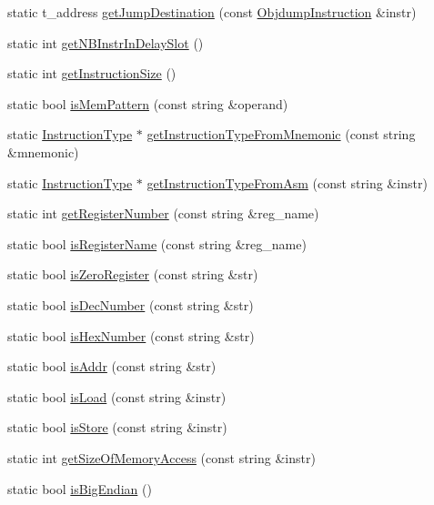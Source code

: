 \begin{DoxyCompactItemize}
\item 
static t\+\_\+address \hyperlink{classArch_a14e634f478d8e7f6b76680184ffdddaf}{get\+Jump\+Destination} (const \hyperlink{classObjdumpInstruction}{Objdump\+Instruction} \&instr)
\item 
static int \hyperlink{classArch_a2cfdbdf8fe0435d65ce6549c4683fd0c}{get\+N\+B\+Instr\+In\+Delay\+Slot} ()
\item 
static int \hyperlink{classArch_af990ba7bfa96246fe0eda6248b5a9608}{get\+Instruction\+Size} ()
\item 
static bool \hyperlink{classArch_ad5c5d6cd8d1a555d0949baadfb83f59a}{is\+Mem\+Pattern} (const string \&operand)
\item 
static \hyperlink{classInstructionType}{Instruction\+Type} $\ast$ \hyperlink{classArch_adc29a91e6fd178a49f2bde6dcc441784}{get\+Instruction\+Type\+From\+Mnemonic} (const string \&mnemonic)
\item 
static \hyperlink{classInstructionType}{Instruction\+Type} $\ast$ \hyperlink{classArch_a25ad6eb3a759792bcb793b61cf629da0}{get\+Instruction\+Type\+From\+Asm} (const string \&instr)
\item 
static int \hyperlink{classArch_ad443b9fd33ae50f27aec5263ba980c47}{get\+Register\+Number} (const string \&reg\+\_\+name)
\item 
static bool \hyperlink{classArch_a23765c24091362fb1e974fba027cdfb1}{is\+Register\+Name} (const string \&reg\+\_\+name)
\item 
static bool \hyperlink{classArch_a5bd70d25a0dcb59d10cdb717c43842f2}{is\+Zero\+Register} (const string \&str)
\item 
static bool \hyperlink{classArch_ab872a6e1e060fce6dbd631ade563a482}{is\+Dec\+Number} (const string \&str)
\item 
static bool \hyperlink{classArch_a98b7249989defd4bdc9cd672592a0262}{is\+Hex\+Number} (const string \&str)
\item 
static bool \hyperlink{classArch_ada2832978d79268be376c443b65b37ed}{is\+Addr} (const string \&str)
\item 
static bool \hyperlink{classArch_a93077d5c7b72a0db0bea3bda59ca50c7}{is\+Load} (const string \&instr)
\item 
static bool \hyperlink{classArch_ab892d0c0ee92b3f04d371e84af1c44da}{is\+Store} (const string \&instr)
\item 
static int \hyperlink{classArch_ad07f05d2dfa30d60ae8a32642b029d10}{get\+Size\+Of\+Memory\+Access} (const string \&instr)
\item 
static bool \hyperlink{classArch_a580b03c8503aa94ed44905e2f525c6fb}{is\+Big\+Endian} ()

\end{DoxyCompactItemize}
